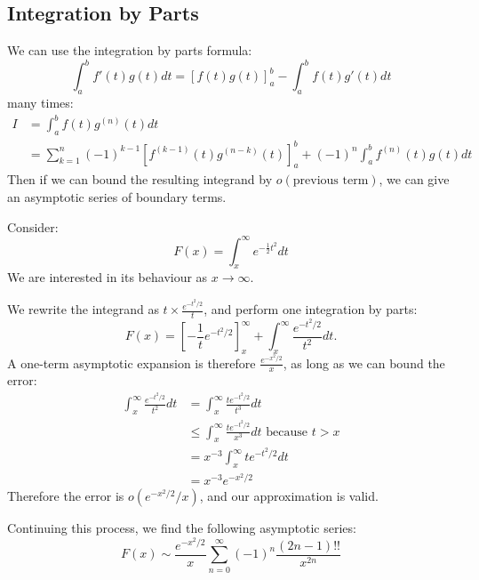 \documentclass[../Main.tex]{subfiles}
\begin{document}
\subsection{Integration by Parts}
We can use the integration by parts formula:
\begin{equation*}
    \int_{a}^{b} f'(t) g(t) dt = \left[f(t)g(t)\right]_a^b - \int_{a}^{b} f(t)g'(t) dt 
\end{equation*}
many times:
\begin{align*}
    I &= \int_{a}^{b} f(t)g^{(n)}(t) dt \\
    &= \sum_{k=1}^{n} (-1)^{k-1} \left[f^{(k-1)}(t) g^{(n-k)}(t)\right]_a^b + (-1)^n \int_{a}^{b} f^{(n)}(t)g(t) dt
\end{align*}
Then if we can bound the resulting integrand by $o(\text{previous term})$, we can give an asymptotic series of boundary terms.
\begin{example}
    Consider:
    \begin{equation*}
        F(x) = \int_{x}^{\infty} e^{-\frac12t^2} dt
    \end{equation*}
    We are interested in its behaviour as $x \to \infty$.

    We rewrite the integrand as $t \times \frac{e^{-t^2 / 2}}{t}$, and perform one integration by parts:
    \begin{equation*}
        F(x) = \left[-\frac1{t} e^{-t^2 / 2}\right]_x^\infty + \int_{x}^{\infty} \frac{e^{-t^2 / 2}}{t^2} dt.
    \end{equation*}
    A one-term asymptotic expansion is therefore $\frac{e^{-x^2 / 2}}{x}$, as long as we can bound the error:
    \begin{align*}
        \int_{x}^{\infty} \frac{e^{-t^2 / 2}}{t^2} dt &= \int_{x}^{\infty} \frac{te^{-t^2 / 2}}{t^3} dt \\
        &\leq \int_{x}^{\infty} \frac{te^{-t^2 / 2}}{x^3} dt \text{ because $t > x$} \\
        &= x^{-3} \int_{x}^{\infty} te^{-t^2 / 2} dt \\
        &= x^{-3} e^{-x^2 / 2}
    \end{align*}
    Therefore the error is $o\left(e^{-x^2 / 2} / x\right)$, and our approximation is valid.

    Continuing this process, we find the following asymptotic series:
    \begin{equation*}
        F(x) \sim \frac{e^{-x^2 / 2}}{x} \sum_{n=0}^{\infty} (-1)^n \frac{(2n-1)!!}{x^{2n}}
    \end{equation*}
\end{example}
\end{document}
